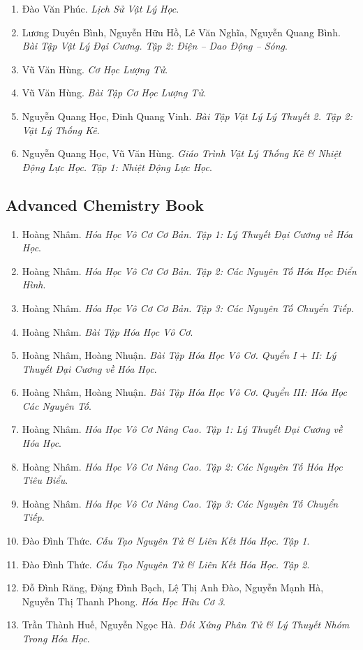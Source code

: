 \documentclass{article}
\begin{document}
\begin{enumerate}
	\item Đào Văn Phúc. \textit{Lịch Sử Vật Lý Học}.
	\item Lương Duyên Bình, Nguyễn Hữu Hồ, Lê Văn Nghĩa, Nguyễn Quang Bình. \textit{Bài Tập Vật Lý Đại Cương. Tập 2: Điện -- Dao Động -- Sóng}.
	\item Vũ Văn Hùng. \textit{Cơ Học Lượng Tử}.
	\item Vũ Văn Hùng. \textit{Bài Tập Cơ Học Lượng Tử}.
	\item Nguyễn Quang Học, Đinh Quang Vinh. \textit{Bài Tập Vật Lý Lý Thuyết 2. Tập 2: Vật Lý Thống Kê}.
	\item Nguyễn Quang Học, Vũ Văn Hùng. \textit{Giáo Trình Vật Lý Thống Kê \& Nhiệt Động Lực Học. Tập 1: Nhiệt Động Lực Học}.
\end{enumerate}


\subsection{Advanced Chemistry Book}

\begin{enumerate}
	\item Hoàng Nhâm. \textit{Hóa Học Vô Cơ Cơ Bản. Tập 1: Lý Thuyết Đại Cương về Hóa Học}.
	\item Hoàng Nhâm. \textit{Hóa Học Vô Cơ Cơ Bản. Tập 2: Các Nguyên Tố Hóa Học Điển Hình}.
	\item Hoàng Nhâm. \textit{Hóa Học Vô Cơ Cơ Bản. Tập 3: Các Nguyên Tố Chuyển Tiếp}.
	\item Hoàng Nhâm. \textit{Bài Tập Hóa Học Vô Cơ}.
	\item Hoàng Nhâm, Hoàng Nhuận. \textit{Bài Tập Hóa Học Vô Cơ. Quyển I $+$ II: Lý Thuyết Đại Cương về Hóa Học}.
	\item Hoàng Nhâm, Hoàng Nhuận. \textit{Bài Tập Hóa Học Vô Cơ. Quyển III: Hóa Học Các Nguyên Tố}.
	\item Hoàng Nhâm. \textit{Hóa Học Vô Cơ Nâng Cao. Tập 1: Lý Thuyết Đại Cương về Hóa Học}.
	\item Hoàng Nhâm. \textit{Hóa Học Vô Cơ Nâng Cao. Tập 2: Các Nguyên Tố Hóa Học Tiêu Biểu}.
	\item Hoàng Nhâm. \textit{Hóa Học Vô Cơ Nâng Cao. Tập 3: Các Nguyên Tố Chuyển Tiếp}.
	\item Đào Đình Thức. \textit{Cấu Tạo Nguyên Tử \& Liên Kết Hóa Học. Tập 1}.
	\item Đào Đình Thức. \textit{Cấu Tạo Nguyên Tử \& Liên Kết Hóa Học. Tập 2}.
	\item Đỗ Đình Răng, Đặng Đình Bạch, Lệ Thị Anh Đào, Nguyễn Mạnh Hà, Nguyễn Thị Thanh Phong. \textit{Hóa Học Hữu Cơ 3}.
	\item Trần Thành Huế, Nguyễn Ngọc Hà. \textit{Đối Xứng Phân Tử \& Lý Thuyết Nhóm Trong Hóa Học}.
\end{enumerate}
\end{document}
